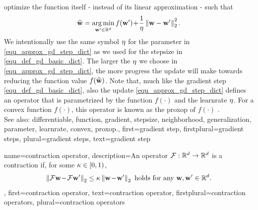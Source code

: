 {{		optimize the \gls{function} itself - instead of its linear approximation - such that
		\begin{align} 
		\label{equ_approx_gd_step_dict}
		\widehat{{\bf w}} = \operatorname*{arg\,min}_{{\bf w}' \in \mathbb{R}^{d}} f({\bf w}')\!+\!\frac{1}{\eta}\left\Vert {{\bf w}-{\bf w}'} \right\Vert_{2}^2. 
		\end{align}
		We intentionally use the same symbol $\eta$ for the \gls{parameter} in \eqref{equ_approx_gd_step_dict} 
		as we used for the \gls{stepsize} in \eqref{equ_def_gd_basic_dict}. The larger the $\eta$ we choose in 
		\eqref{equ_approx_gd_step_dict}, the more progress the update will make towards reducing the 
		\gls{function} value $f(\widehat{{\bf w}})$. Note that, much like the \gls{gradient} step \eqref{equ_def_gd_basic_dict}, 
		also the update \eqref{equ_approx_gd_step_dict} defines an operator 
		that is parametrized by the \gls{function} $f(\cdot)$ and the \gls{learnrate} $\eta$. For a \gls{convex} \gls{function}  
		$f(\cdot)$, this operator is known as the \gls{proxop} of $f(\cdot)$ \cite{ProximalMethods}. 
					\\ 
		See also: \gls{differentiable}, \gls{function}, \gls{gradient}, \gls{stepsize}, \gls{neighborhood}, \gls{generalization}, \gls{parameter}, \gls{learnrate}, \gls{convex}, \gls{proxop}.},
	first={gradient step},
	firstplural={gradient steps},
	plural={gradient steps},
	text={gradient step}
}

{name={contraction operator},
	description={An operator $\mathcal{F}: \mathbb{R}^{d} \rightarrow \mathbb{R}^{d}$
		is a contraction if, for some $\kappa \in [0,1)$,
		\begin{equation} 
			\nonumber
			\left\Vert { \mathcal{F}{\bf w}\!-\!\mathcal{F}{\bf w}'} \right\Vert_{2}  \leq  \kappa	\left\Vert {{\bf w}\!-\!{\bf w}'} \right\Vert_{2} \mbox{ holds for any } {\bf w},{\bf w}' \in \mathbb{R}^{d}.
		\end{equation}
	},
	first={contraction operator},
	text={contraction operator}, 
	firstplural={contraction operators}, 
	plural={contraction operators}
}
	

